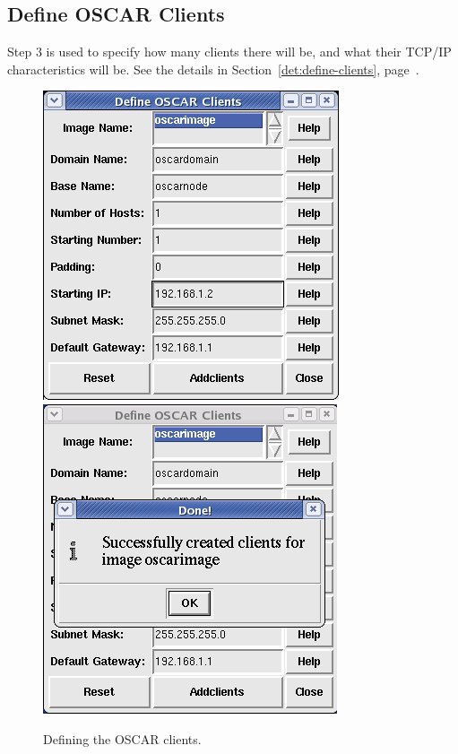 
\clearpage
\subsection{Define OSCAR Clients}

Step 3 is used to specify how many clients there will be, and what
their TCP/IP characteristics will be.  See the details in
Section~\ref{det:define-clients}, page~\pageref{det:define-clients}.
 
\begin{figure}[ht!]
  \begin{center}
    \centerline{
      \includegraphics[scale=\imgscale]{figs/5a_sbs-define-clients1}
      \hspace{\imghskip}
      \includegraphics[scale=\imgscale]{figs/5b_sbs-define-clients2}
      }
    \caption{Defining the OSCAR clients.}
    \label{fig:sbs-define-clients}
  \end{center}
\end{figure}


